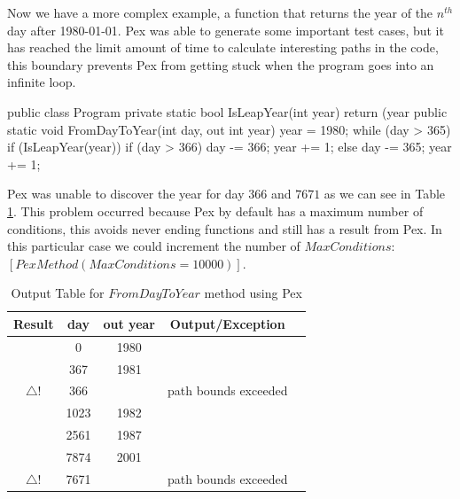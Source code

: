 \documentclass[10pt, conference, compsocconf]{IEEEtran}
\newcommand{\checkK}{\color{ForestGreen}\checkmark}
\newcommand{\bigexclaim}{\color{Dandelion}$\bigtriangleup$\hspace{-5.6pt}!}
\begin{document}
Now we have a more complex example, a function that returns the year of the $n^{th}$ day after 1980-01-01.
Pex was able to generate some important test cases, but it has reached the limit amount of time to calculate interesting paths in the code,
this boundary prevents Pex from getting stuck when the program goes into
an infinite loop.

\begin{code}
public class Program {
  private static bool IsLeapYear(int year) {
    return (year %
  }
  public static void FromDayToYear(int day, out int year) {
    year = 1980;
    while (day > 365) {
      if (IsLeapYear(year)) {
        if (day > 366) {
          day -= 366;
          year += 1;
        }
      } else {
        day -= 365;
        year += 1;
      }
    }
  }
}
\end{code}

Pex was unable to discover the year for day $366$ and $7671$ as we can see in Table \ref{tab:leap}.
This problem occurred because Pex by default has a maximum number of conditions, this avoids never ending functions and still has a result from Pex.
In this particular case we could increment the number of $MaxConditions$: $[PexMethod(MaxConditions=10000)]$.

\begin{table}[!ht]
\renewcommand{\arraystretch}{1.3}
\caption{Output Table for $FromDayToYear$ method using Pex}
\label{tab:leap}
\centering
\noindent \begin{tabular}{|c|c|c|c|c|}\hline
Result & day & out year & Output/Exception\\\hline
\checkK & 0 & 1980 & \\\hline
\checkK & 367 & 1981 & \\\hline
\bigexclaim & 366 & & path bounds exceeded\\\hline
\checkK & 1023 & 1982 &\\\hline
\checkK & 2561 & 1987 & \\\hline
\checkK & 7874 & 2001 & \\\hline
\bigexclaim &  7671 & & path bounds exceeded\\\hline
\end{tabular}
\end{table}
\end{document}
